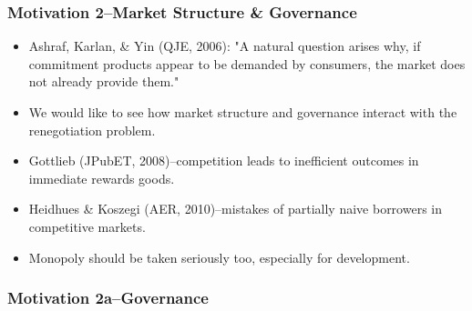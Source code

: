 \documentclass[11pt]{article}%
\providecommand{\DIFaddbegin}{} %
\providecommand{\DIFaddend}{} %
\providecommand{\DIFdelbegin}{} %
\providecommand{\DIFdelend}{} %
\begin{document}
\bigskip%

\DIFdelbegin %
\DIFdelend %
\DIFaddbegin \frametitle{Motivation 2--Market Structure \& Governance}%
\DIFaddend 


\begin{itemize}
\item Ashraf, Karlan, \& Yin (QJE, 2006): "A natural question arises why, if
commitment products appear to be demanded by consumers, the market does not
already provide them."

\item We would like to see how market structure and governance interact with
the renegotiation problem.

\item Gottlieb (JPubET, 2008)--competition leads to inefficient outcomes in
immediate rewards goods.

\item Heidhues \& Koszegi (AER, 2010)--mistakes of partially naive borrowers
in competitive markets.

\item Monopoly should be taken seriously too, especially for development.
\end{itemize}

\DIFdelbegin %
\DIFdelend %

\DIFaddbegin \frametitle{Motivation 2a--Governance}%
\end{document}
